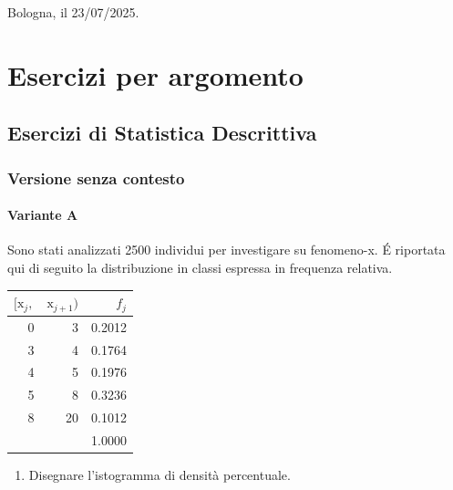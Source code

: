 \documentclass[
  11pt,
]{book}
\providecommand{\tightlist}{%
  \setlength{\itemsep}{0pt}\setlength{\parskip}{0pt}}
\theoremstyle{mytheoremstyle}
\theoremstyle{mydefstyle}
\begin{document}
Bologna, il 23/07/2025.

\part{Esercizi per argomento}

\chapter{Esercizi di Statistica Descrittiva}\label{esercizi-di-statistica-descrittiva}

\section{Versione senza contesto}\label{versione-senza-contesto}

\subsection{Variante A}\label{variante-a}

Sono stati analizzati 2500 individui per investigare su fenomeno-x. É riportata qui di seguito la distribuzione in classi espressa in frequenza relativa.

\begin{tabular}{rrr}
\toprule
$[\text{x}_j,$ & $\text{x}_{j+1})$ & $f_j$\\
\midrule
0 & 3 & 0.2012\\
3 & 4 & 0.1764\\
4 & 5 & 0.1976\\
5 & 8 & 0.3236\\
8 & 20 & 0.1012\\
 &  & 1.0000\\
\bottomrule
\end{tabular}

\begin{enumerate}
\def\labelenumi{\alph{enumi}.}
\tightlist
\item
  Disegnare l'istogramma di densità percentuale.
\end{enumerate}
\end{document}
